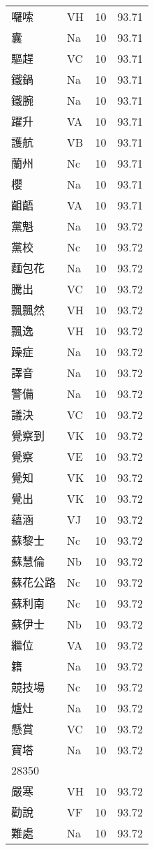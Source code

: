 \documentclass[twocolumn]{book}
\begin{document}
\begin{supertabular}{llrr}
囉嗦 & VH & 10 &  93.71\\
囊 & Na & 10 &  93.71\\
驅趕 & VC & 10 &  93.71\\
鐵鍋 & Na & 10 &  93.71\\
鐵腕 & Na & 10 &  93.71\\
躍升 & VA & 10 &  93.71\\
護航 & VB & 10 &  93.71\\
蘭州 & Nc & 10 &  93.71\\
櫻 & Na & 10 &  93.71\\
齟齬 & VA & 10 &  93.71\\
黨魁 & Na & 10 &  93.72\\
黨校 & Nc & 10 &  93.72\\
麵包花 & Na & 10 &  93.72\\
騰出 & VC & 10 &  93.72\\
飄飄然 & VH & 10 &  93.72\\
飄逸 & VH & 10 &  93.72\\
躁症 & Na & 10 &  93.72\\
譯音 & Na & 10 &  93.72\\
警備 & Na & 10 &  93.72\\
議決 & VC & 10 &  93.72\\
覺察到 & VK & 10 &  93.72\\
覺察 & VE & 10 &  93.72\\
覺知 & VK & 10 &  93.72\\
覺出 & VK & 10 &  93.72\\
蘊涵 & VJ & 10 &  93.72\\
蘇黎士 & Nc & 10 &  93.72\\
蘇慧倫 & Nb & 10 &  93.72\\
蘇花公路 & Nc & 10 &  93.72\\
蘇利南 & Nc & 10 &  93.72\\
蘇伊士 & Nb & 10 &  93.72\\
繼位 & VA & 10 &  93.72\\
籍 & Na & 10 &  93.72\\
競技場 & Nc & 10 &  93.72\\
爐灶 & Na & 10 &  93.72\\
懸賞 & VC & 10 &  93.72\\
寶塔 & Na & 10 &  93.72\\
28350\\
嚴寒 & VH & 10 &  93.72\\
勸說 & VF & 10 &  93.72\\
難處 & Na & 10 &  93.72\\

\end{supertabular}
\end{document}
